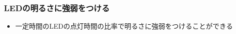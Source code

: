 \documentclass[slide05.tex]{subfiles}
\begin{document}
\begin{frame}
    \frametitle{LEDの明るさに強弱をつける}
    \begin{center}
        \begin{figure}
            
        \end{figure}
        \begin{itemize}
            \item 一定時間のLEDの点灯時間の比率で明るさに強弱をつけることができる
        \end{itemize}
    \end{center}
\end{frame}
\end{document}
